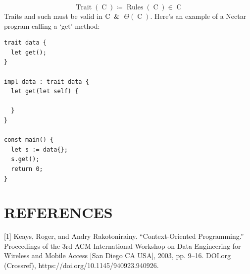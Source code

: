 \documentclass[10pt, twocolumn]{article}
\theoremstyle{plain}
\theoremstyle{definition}
\theoremstyle{remark}
\begin{document}
\begin{equation}
    \operatorname{Trait}(\operatorname{C}) \coloneqq \operatorname{Rules}(\operatorname{C}) \in \operatorname{C}
\end{equation}
Traits and such must be valid in $\operatorname{C} \And$ $\Theta(\operatorname{C})$.
Here's an example of a Nectar program calling a `get' method:

\begin{lstlisting}
trait data {
  let get();
}

impl data : trait data {
  let get(let self) {

  }
}

const main() {
  let s := data{};
  s.get();
  return 0;
}    
\end{lstlisting}

\section{REFERENCES}
\label{sec:cl-references}
[1] Keays, Roger, and Andry Rakotonirainy. “Context-Oriented Programming.” Proceedings of the 3rd ACM International Workshop on Data Engineering for Wireless and Mobile Access [San Diego CA USA], 2003, pp. 9–16. DOI.org (Crossref), https://doi.org/10.1145/940923.940926.
\end{document}
